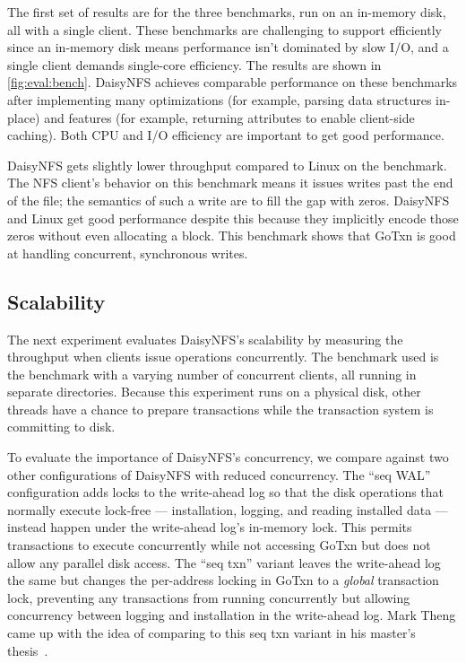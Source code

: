 The first set of results are for the three benchmarks, run on an in-memory disk, all
with a single client. These benchmarks are challenging to support efficiently
since an in-memory disk means performance isn't dominated by slow I/O, and a
single client demands single-core efficiency.
The results are shown in \cref{fig:eval:bench}. DaisyNFS achieves
comparable performance on these benchmarks after implementing many optimizations
(for example, parsing data structures in-place) and features (for example,
returning attributes to enable client-side caching). Both CPU and I/O efficiency
are important to get good performance.

DaisyNFS gets slightly lower throughput compared to Linux on the 
benchmark. The NFS client's behavior on
this benchmark means it issues writes past the end of the file; the semantics of
such a write are to fill the gap with zeros. DaisyNFS and Linux get good
performance despite this because they implicitly encode those zeros without even
allocating a block. This benchmark shows that GoTxn is good at handling
concurrent, synchronous writes.

\subsection{Scalability}

The next experiment evaluates DaisyNFS's scalability by measuring the throughput
when clients issue operations concurrently. The benchmark used is the 
benchmark with a varying number of concurrent clients, all running in separate
directories. Because this experiment runs on a physical disk, other threads have
a chance to prepare transactions while the transaction system is committing to
disk.

To evaluate the importance of DaisyNFS's concurrency, we compare against two
other configurations of DaisyNFS with reduced concurrency. The ``seq WAL'' configuration
adds locks to the write-ahead log so that the disk operations that normally
execute lock-free --- installation, logging, and reading installed data ---
instead happen under the write-ahead log's in-memory lock. This permits
transactions to execute concurrently while not accessing GoTxn but does not
allow any parallel disk access. The ``seq txn'' variant leaves the write-ahead
log the same but changes the per-address locking in GoTxn to a \emph{global}
transaction lock, preventing any transactions from running concurrently but
allowing concurrency between logging and installation in the write-ahead log.
Mark Theng came up with the idea of comparing to this seq txn variant in his
master's thesis~\cite{mtheng-meng}.

